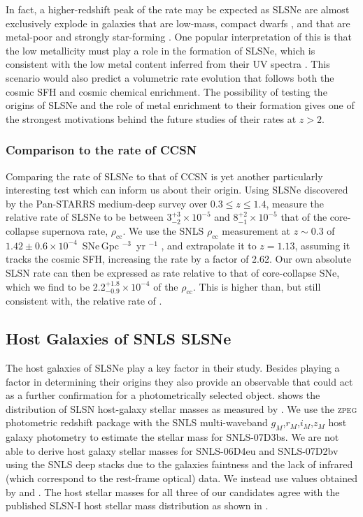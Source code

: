 In fact, a higher-redshift peak of the rate may be expected as SLSNe are almost exclusively explode in galaxies that are low-mass, compact dwarfs \citep{Neill2011,Lunnan2015}, and that are metal-poor and strongly star-forming \citep{Chen2013,Lunnan2013,Leloudas2015}. One popular interpretation of this is that the low metallicity must play a role in the formation of SLSNe, which is consistent with the low metal content inferred from their UV spectra \citep{Mazzalli2016}. This scenario would also predict a volumetric rate evolution that follows both the cosmic SFH and cosmic chemical enrichment. The possibility of testing the origins of SLSNe and the role of metal enrichment to their formation gives one of the strongest motivations behind the future studies of their rates at $z>2$.

\subsubsection{Comparison to the rate of CCSN}
Comparing the rate of SLSNe to that of CCSN is yet another particularly interesting test which can inform us about their origin. Using SLSNe discovered by the Pan-STARRS medium-deep survey over $0.3 \leq z \leq 1.4$, \citet{McCrum2014} measure the relative rate of SLSNe to be between $3^{+3}_{-2}\times10^{-5}$ and $8^{+2}_{-1}\times10^{-5}$ that of the core-collapse supernova rate, $\rho_{\mathrm{cc}}$. We use the SNLS $\rho_{\mathrm{cc}}$ measurement at $z\sim0.3$ of $1.42\pm0.6\times10^{-4}$ \,SNe\,Gpc $^{-3}$ \,yr $^{-1}$ \citep{Bazin2009}, and extrapolate it to $z=1.13$, assuming it tracks the cosmic SFH, increasing the rate by a factor of 2.62. Our own absolute SLSN rate can then be expressed as rate relative to that of core-collapse SNe, which we find to be 2.2$^{+1.8}_{-0.9}\times10^{-4}$ of the $\rho_{\mathrm{cc}}$. This is higher than, but still consistent with, the relative rate of \citet{McCrum2014}.

\subsection{Host Galaxies of SNLS SLSNe}
The host galaxies of SLSNe play a key factor in their study. Besides playing a factor in determining their origins they also provide an observable that could act as a further confirmation for a photometrically selected object.  shows the distribution of SLSN host-galaxy stellar masses as measured by \cite{Lunnan2014}. We use the \textsc{zpeg} photometric redshift package \citep{LeBorgne2002} with the SNLS multi-waveband $g_M$,$r_M$,$i_M$,$z_M$ host galaxy photometry to estimate the stellar mass for SNLS-07D3bs. We are not able to derive host galaxy stellar masses for SNLS-06D4eu and SNLS-07D2bv using the SNLS deep stacks due to the galaxies faintness and the lack of infrared (which correspond to the rest-frame optical) data. We instead use values obtained by \citet{Leloudas2015a} and \citet{Schulze2017}. The host stellar masses for all three of our candidates agree with the published SLSN-I host stellar mass distribution as shown in .

